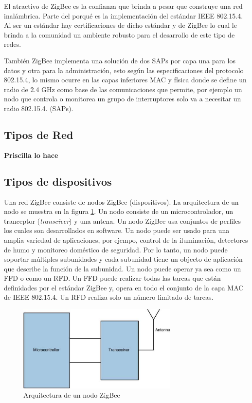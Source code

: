 \documentclass[10pt,journal,compsoc]{IEEEtran}
\begin{document}
El atractivo de ZigBee es la confianza que brinda a pesar que construye una red inalámbrica. Parte del porqué es la implementación del estándar IEEE 802.15.4. Al ser un estándar hay certificaciones de dicho estándar y de ZigBee lo cual le brinda a la comunidad un ambiente robusto para el desarrollo de este tipo de redes.

También ZigBee implementa una solución de dos SAPs por capa una para los datos y otra para la administración, esto según las especificaciones del protocolo 802.15.4, lo mismo ocurre en las capas inferiores MAC y física donde se define un radio de 2.4 GHz como base de las comunicaciones que permite, por ejemplo un nodo que controla o monitorea un grupo de interruptores solo va a necesitar un radio 802.15.4. (SAPs).

\subsection{Tipos de Red}

\textbf{Priscilla lo hace}

\subsection{Tipos de dispositivos}
Una red ZigBee consiste de nodos ZigBee (dispositivos). La arquitectura de un nodo se muestra en la figura \ref{fig:device-architecture}. Un nodo consiste de un microcontrolador, un tranceptor (\emph{transciver}) y una antena. Un nodo ZigBee usa conjuntos de perfiles los cuales son desarrollados en software. Un nodo puede ser usado para una amplia variedad de aplicaciones, por ejempo, control de la iluminación, detectores de humo y monitoreo doméstico de seguridad. Por lo tanto, un nodo puede soportar múltiples subunidades y cada subunidad tiene un objecto de aplicación que describe la función de la subunidad. Un nodo puede operar ya sea como un FFD o como un RFD. Un FFD puede realizar todas las tareas que están definidades por el estándar ZigBee y, opera en todo el conjunto de la capa MAC de IEEE 802.15.4. Un RFD realiza solo un número limitado de tareas.

\begin{figure}[h]
    \centering
    \includegraphics[width=8cm]{device-architecture}
    \caption{Arquitectura de un nodo ZigBee}
    \label{fig:device-architecture}
\end{figure}
\end{document}
